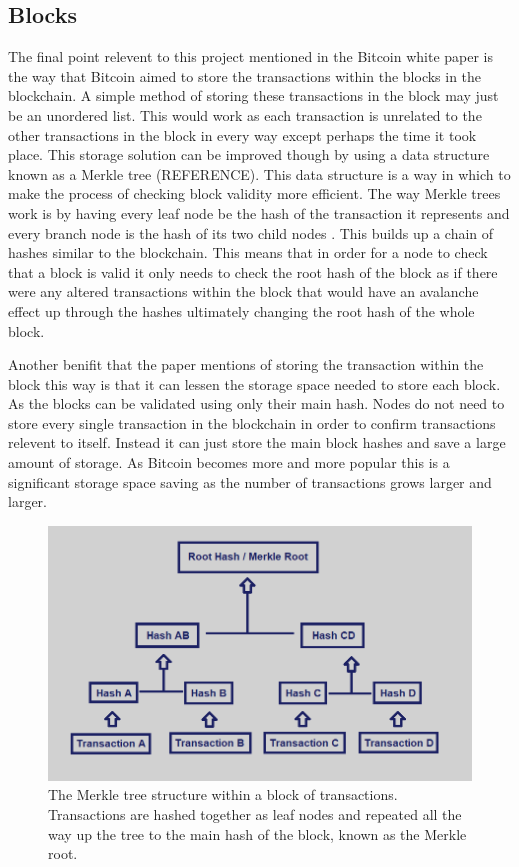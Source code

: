 \documentclass{l4proj}
\begin{document}
\subsection{Blocks}
The final point relevent to this project mentioned in the Bitcoin white paper is the way that Bitcoin aimed to store
the transactions within the blocks in the blockchain. A simple method of storing these transactions in the block may
just be an unordered list. This would work as each transaction is unrelated to the other transactions in the block in
every way except perhaps the time it took place. This storage solution can be improved though by using a data structure
known as a Merkle tree (REFERENCE). This data structure is a way in which to make the process of checking block validity
more efficient. The way Merkle trees work is by having every leaf node be the hash of the transaction it represents 
and every branch node is the hash of its two child nodes . This builds up a chain of hashes similar to the blockchain.
This means that in order for a node to check that a block is valid it only needs to check the root hash of the block as
if there were any altered transactions within the block that would have an avalanche effect up through the hashes
ultimately changing the root hash of the whole block.

Another benifit that the paper mentions of storing the transaction within the block this way is that it can lessen
the storage space needed to store each block. As the blocks can be validated using only their main hash. Nodes do 
not need to store every single transaction in the blockchain in order to confirm transactions relevent to itself.
Instead it can just store the main block hashes and save a large amount of storage. As Bitcoin becomes more and
more popular this is a significant storage space saving as the number of transactions grows larger and larger.

\begin{figure}
    \centering
    \includegraphics[width=0.7\linewidth]{images/merkle-tree.png}    

    \caption{
        The Merkle tree structure within a block of transactions. Transactions are hashed together as leaf nodes
        and repeated all the way up the tree to the main hash of the block, known as the Merkle root.
    }

    \label{fig:merkle}
\end{figure}
\end{document}
